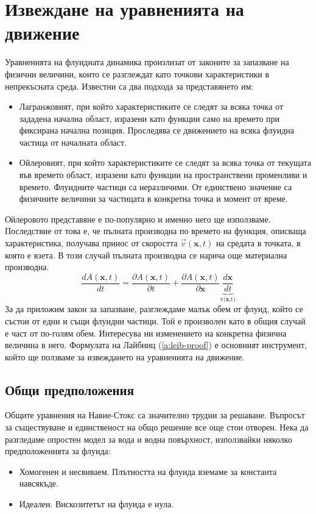 \documentclass[12pt]{article}
\numberwithin{equation}{section}
\newcommand{\vel}{\vec{v}}
\begin{document}
\section{Извеждане на уравненията на движение}
Уравненията на флуидната динамика произлизат от законите за запазване на физични величини, които се разглеждат като точкови характеристики в непрекъсната среда. Известни са два подхода за представянето им:
\begin{itemize}
    \item Лагранжовият, при който характеристиките се следят за всяка точка от зададена начална област, изразени като функции само на времето при фиксирана начална позиция. Проследява се движението на всяка флуидна частица от началната област.
    \item Ойлеровият, при който характеристиките се следят за всяка точка от текущата във времето област, изразени като функции на пространствени променливи и времето. Флуидните частици са неразличими. От единствено значение са физичните величини за частицата в конкретна точка и момент от време.
\end{itemize}
Ойлеровото представяне е по-популярно и именно него ще използваме. Последствие от това е, че пълната производна по времето на функция, описваща характеристика, получава принос от скоростта $\vel(\mathbf{x},t)$ на средата в точката, в която е взета. В този случай пълната производна се нарича още материална производна.
\begin{equation}
    \frac{dA(\mathbf{x},t)}{dt}=\frac{\partial A(\mathbf{x},t)}{\partial t} + \frac{\partial A(\mathbf{x},t)}{\partial \mathbf{x}}\underbrace{\frac{d\mathbf{x}}{dt}}_\text{v($\mathbf{x}$,t)}
\end{equation}
За да приложим закон за запазване, разглеждаме малък обем от флуид, който се състои от едни и същи флуидни частици. Той е произволен като в общия случай е част от по-голям обем. Интересува ни изменението на конкретна физична величина в него. Формулата на Лайбниц (\autoref{a:leib-proof}) е основният инструмент, който ще ползваме за извеждането на уравненията на движение.

\subsection{Общи предположения}
Общите уравнения на Навие-Стокс са значително трудни за решаване. Въпросът за съществуване и единственост на общо решение все още стои отворен. Нека да разгледаме опростен модел за вода и водна повърхност, използвайки няколко предположенията за флуида:
\begin{itemize}
    \item Хомогенен и несвиваем. Плътността на флуида вземаме за константа навсякъде.
    \item Идеален. Вискозитетът на флуида е нула.
\end{itemize}
\end{document}
